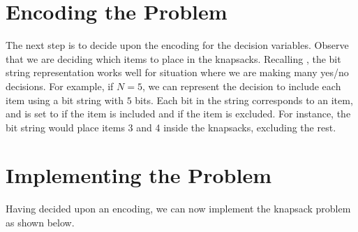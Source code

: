 \section{Encoding the Problem}
The next step is to decide upon the encoding for the decision variables.  Observe that we are deciding which items to place in the knapsacks.  Recalling , the bit string representation works well for situation where we are making many yes/no decisions.  For example, if $N=5$, we can represent the decision to include each item using a bit string with $5$ bits.  Each bit in the string corresponds to an item, and is set to  if the item is included and  if the item is excluded.  For instance, the bit string  would place items 3 and 4 inside the knapsacks, excluding the rest.

\section{Implementing the Problem}
Having decided upon an encoding, we can now implement the knapsack problem as shown below.


